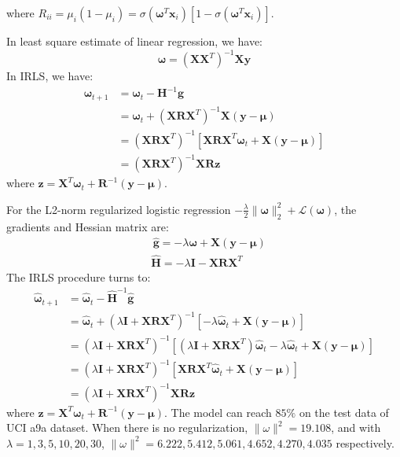\documentclass[12pt]{article}
\begin{document}
where $R_{ii}=\mu_i\left(1-\mu_i\right)=\sigma\left(\bm{\omega}^T\bm{x}_i\right)\left[1-\sigma\left(\bm{\omega}^T\bm{x}_i\right)\right]$.
\par
In least square estimate of linear regression, we have:
$$\bm{\omega}=\left(\bm{X}\bm{X}^T\right)^{-1}\bm{X}\bm{y}$$
In IRLS, we have:
\begin{align*}
\bm{\omega}_{t+1}&=\bm{\omega}_t-\bm{H}^{-1}\bm{g}\\
&=\bm{\omega}_t+\left(\bm{X}\bm{R}\bm{X}^T\right)^{-1}\bm{X}\left(\bm{y}-\bm{\mu}\right)\\
&=\left(\bm{X}\bm{R}\bm{X}^T\right)^{-1}\left[\bm{X}\bm{R}\bm{X}^T\bm{\omega}_t+\bm{X}\left(\bm{y}-\bm{\mu}\right)\right]\\
&=\left(\bm{X}\bm{R}\bm{X}^T\right)^{-1}\bm{X}\bm{R}\bm{z}
\end{align*}
where $\bm{z}=\bm{X}^T\bm{\omega}_t+\bm{R}^{-1}\left(\bm{y}-\bm{\mu}\right)$.
\par
For the L2-norm regularized logistic regression $-\frac{\lambda}{2}\|\bm{\omega}\|_2^2+\mathcal{L}\left(\bm{\omega}\right)$, the gradients and Hessian matrix are:
\begin{align*}
&\,\hat{\bm{g}}=-\lambda\bm{\omega}+\bm{X}\left(\bm{y}-\bm{\mu}\right)\\
&\hat{\bm{H}}=-\lambda\bm{I}-\bm{X}\bm{R}\bm{X}^T
\end{align*}
The IRLS procedure turns to:
\begin{align*}
\hat{\bm{\omega}}_{t+1}&=\hat{\bm{\omega}}_t-\hat{\bm{H}}^{-1}\hat{\bm{g}}\\
&=\hat{\bm{\omega}}_t+\left(\lambda\bm{I}
+\bm{X}\bm{R}\bm{X}^T\right)^{-1}\left[-\lambda\hat{\bm{\omega}}_t+\bm{X}\left(\bm{y}-\bm{\mu}\right)\right]\\
&=\left(\lambda\bm{I}
+\bm{X}\bm{R}\bm{X}^T\right)^{-1}\left[\left(\lambda\bm{I}
+\bm{X}\bm{R}\bm{X}^T\right)\hat{\bm{\omega}}_t-\lambda\hat{\bm{\omega}}_t+\bm{X}\left(\bm{y}-\bm{\mu}\right)\right]\\
&=\left(\lambda\bm{I}
+\bm{X}\bm{R}\bm{X}^T\right)^{-1}\left[\bm{X}\bm{R}\bm{X}^T\hat{\bm{\omega}}_t+\bm{X}\left(\bm{y}-\bm{\mu}\right)\right]\\
&=\left(\lambda\bm{I}
+\bm{X}\bm{R}\bm{X}^T\right)^{-1}\bm{X}\bm{R}\bm{z}
\end{align*}
where $\bm{z}=\bm{X}^T\bm{\omega}_t+\bm{R}^{-1}\left(\bm{y}-\bm{\mu}\right)$.
The model can reach $85\%$ on the test data of UCI a9a dataset. When there is no regularization, $\|\omega\|^2=19.108$, and with $\lambda=1,3,5,10,20,30$, $\|\omega\|^2=6.222,5.412,5.061,4.652,4.270,4.035$ respectively.
\end{document}
